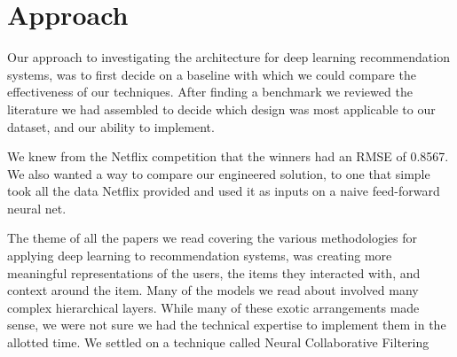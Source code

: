 \section{Approach}

Our approach to investigating the architecture for deep learning recommendation systems, was to first decide on a baseline with which we could compare the effectiveness of our techniques. After finding a benchmark we reviewed the literature we had assembled to decide which design was most applicable to our dataset, and our ability to implement.

 We knew from the Netflix competition that the winners had an RMSE of 0.8567. We also wanted a way to compare our engineered solution, to one that simple took all the data Netflix provided and used it as inputs on a naive feed-forward neural net.

 The theme of all the papers we read covering the various methodologies for applying deep learning to recommendation systems, was creating more meaningful representations of the users, the items they interacted with, and context around the item. Many of the models we read about involved many complex hierarchical layers. While many of these exotic arrangements made sense, we were not sure we had the technical expertise to implement them in the allotted time. We settled on a technique called Neural Collaborative Filtering \cite{He2017}